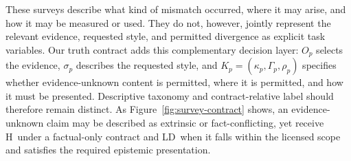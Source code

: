 \documentclass{clv2025}
\newcommand{\LD}{\textsc{LD}}
\newcommand{\Hall}{\textsc{H}}
\begin{document}
These surveys describe what kind of mismatch occurred, where it may arise, and how it may be measured or used.
They do not, however, jointly represent the relevant evidence, requested style, and permitted divergence as explicit task variables.
Our truth contract adds this complementary decision layer: $O_p$ selects the evidence, $\sigma_p$ describes the requested style, and $K_p=(\kappa_p,\Gamma_p,\rho_p)$ specifies whether evidence-unknown content is permitted, where it is permitted, and how it must be presented.
Descriptive taxonomy and contract-relative label should therefore remain distinct.
As Figure~\ref{fig:survey-contract} shows, an evidence-unknown claim may be described as extrinsic or fact-conflicting, yet receive \Hall\ under a factual-only contract and \LD\ when it falls within the licensed scope and satisfies the required epistemic presentation.
\end{document}
